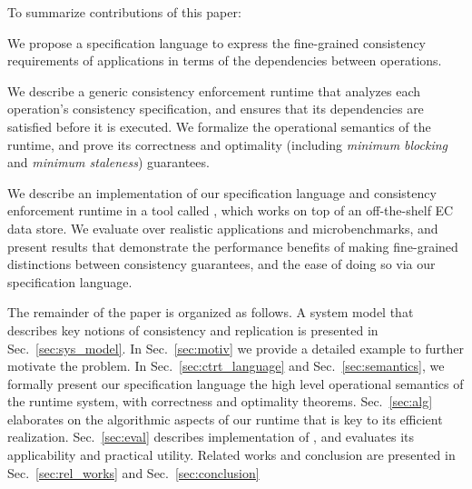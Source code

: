 To summarize contributions of this paper:
\begin{enumerate*}[label=(\roman*)]  
\item We propose a specification language to
    express the fine-grained consistency requirements of applications 
    in terms of the dependencies between operations.

\item We describe a generic consistency enforcement runtime that
    analyzes each operation's consistency specification, and ensures
    that its dependencies are satisfied before it is executed.    
    We formalize the operational semantics of the runtime, and prove its
    correctness and optimality (including \emph{minimum blocking} and
    \emph {minimum staleness}) guarantees. 
    
  \item We describe an implementation of our specification language and
    consistency enforcement runtime in a tool called \tool, which
    works on top of an off-the-shelf EC data store. We evaluate \tool
    over realistic applications and microbenchmarks, and present
    results that demonstrate the performance benefits of making
    fine-grained distinctions between consistency guarantees, and the
    ease of doing so via our specification language.

\end{enumerate*}

The remainder of the paper is organized as follows. A system model that describes key notions of consistency and
replication is presented in Sec.~\ref{sec:sys_model}.  In
Sec.~\ref{sec:motiv} we provide a detailed example to further motivate
the problem.  In Sec.~\ref{sec:ctrt_language} and
Sec.~\ref{sec:semantics}, we formally present our specification language
the high level operational semantics of the runtime system, with
correctness and optimality theorems. Sec.~\ref{sec:alg}
elaborates on the algorithmic aspects of our runtime that is key to
its efficient realization. Sec.~\ref{sec:eval} describes
implementation of \tool, and evaluates its applicability and practical utility.
Related works and conclusion are presented in
Sec.~\ref{sec:rel_works} and Sec.~\ref{sec:conclusion}





